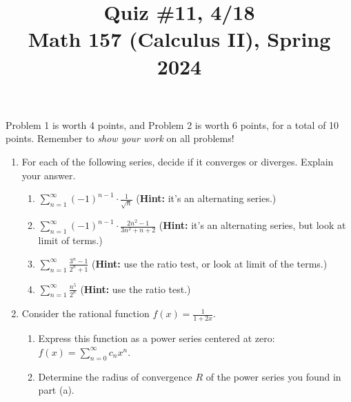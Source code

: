 \documentclass[11pt]{article}
\title{Quiz \#11, 4/18\\ Math 157 (Calculus II), Spring 2024}
\date{}
\begin{document}
\maketitle

\thispagestyle{empty}

\vspace{-2cm}

Problem 1 is worth 4 points, and Problem 2 is worth 6 points, for a total of 10 points. Remember to \emph{show your work} on all problems!

\begin{enumerate}

\item For each of the following series, decide if it converges or diverges. Explain your answer.

\begin{enumerate}
\item $\displaystyle \sum_{n=1}^{\infty} (-1)^{n-1} \cdot \frac{1}{\sqrt{n}}$ \hfill ({\bf Hint:} it's an alternating series.)
\item $\displaystyle \sum_{n=1}^{\infty} (-1)^{n-1}\cdot \frac{2n^2-1}{3n^2+n+2} $ \hfill ({\bf Hint:} it's an alternating series, but look at limit of terms.)
\item $\displaystyle \sum_{n=1}^{\infty} \frac{3^n-1}{2^n+1}$ \hfill ({\bf Hint:} use the ratio test, or look at limit of the terms.)
\item $\displaystyle \sum_{n=1}^{\infty} \frac{n^5}{2^n}$ \hfill ({\bf Hint:} use the ratio test.)
\end{enumerate}

\vspace{1.75in}

\item Consider the rational function $f(x) = \displaystyle \frac{1}{1+2x}$.
\begin{enumerate}
\item Express this function as a power series centered at zero: $f(x) = \displaystyle \sum_{n=0}^{\infty} c_n x^n$.
\item Determine the radius of convergence $R$ of the power series you found in part (a).
\end{enumerate}

\end{enumerate}
\end{document}
